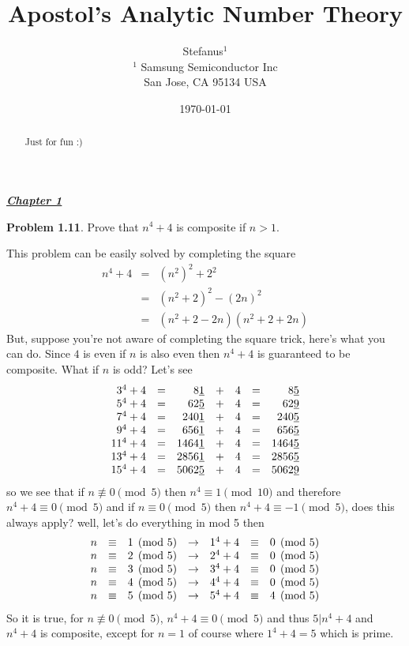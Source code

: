 \documentclass[aps,preprint,preprintnumbers,nofootinbib,showpacs,prd]{revtex4-1}
\newcommand{\nbea}{\begin{eqnarray*}}
\newcommand{\neea}{\end{eqnarray*}}
\begin{document}
\title{Apostol's Analytic Number Theory}
\bigskip
\author{Stefanus$^1$\\
$^1$ Samsung Semiconductor Inc\\ San Jose, CA 95134 USA\\
}
%
\date{\today}
%
\begin{abstract}
Just for fun :)

\end{abstract}
%
\maketitle

\renewcommand{\theequation}{A.\arabic{equation}}  %
\setcounter{equation}{0}  %

\bigskip
\underline{\textbf{\textit{Chapter 1}}}
\bigskip

{\bf Problem 1.11}. Prove that $n^4 + 4$ is composite if $n > 1$.

This problem can be easily solved by completing the square
%
\nbea
n^4 + 4 & = & (n^2)^2 + 2^2 \\
& = & (n^2 + 2)^2 - (2n)^2 \\
& = & (n^2 + 2 - 2n)(n^2 + 2 + 2n)
\neea
%
But, suppose you're not aware of completing the square trick, here's what you can do. Since $4$ is even if $n$ is also even then $n^4 + 4$ is guaranteed to be composite. What if $n$ is odd? Let's see
%
\nbea
\begin{array}{r c r c r c r}
3^4 + 4 & = & 8\underline{1} &+& 4 &=& 8\underline{5} \\
5^4 + 4 & = & 62\underline{5} &+& 4 &=& 62\underline{9} \\
7^4 + 4 & = & 240\underline{1} &+& 4 &=& 240\underline{5} \\
9^4 + 4 & = & 656\underline{1} &+& 4 &=& 656\underline{5} \\
11^4 + 4 & = & 1464\underline{1} &+& 4 &=& 1464\underline{5} \\
13^4 + 4 & = & 2856\underline{1} &+& 4 &=& 2856\underline{5} \\
15^4 + 4 & = & 5062\underline{5} &+& 4 &=& 5062\underline{9}
\end{array}
\neea
%
so we see that if $n \not\equiv 0 \pmod{5}$ then $n^4 \equiv 1 \pmod{10}$ and therefore $n^4 + 4 \equiv 0 \pmod{5}$ and if $n \equiv 0 \pmod{5}$ then $n^4 + 4 \equiv -1 \pmod{5}$, does this always apply? well, let's do everything in mod 5 then
%
\nbea
\begin{array}{r c l c r c l}
n & \equiv & 1\pmod{5} & \to & 1^4 + 4 & \equiv & 0 \pmod {5} \\
n & \equiv & 2\pmod{5} & \to & 2^4 + 4 & \equiv & 0 \pmod {5} \\
n & \equiv & 3\pmod{5} & \to & 3^4 + 4 & \equiv & 0 \pmod {5} \\
n & \equiv & 4\pmod{5} & \to & 4^4 + 4 & \equiv & 0 \pmod {5} \\
n & \equiv & 5\pmod{5} & \to & 5^4 + 4 & \equiv & 4 \pmod {5}
\end{array}
\neea
%
So it is true, for $n \not\equiv 0 \pmod{5}$, $n^4 + 4 \equiv 0 \pmod{5}$ and thus $5|n^4 + 4$ and $n^4 + 4$ is composite, except for $n=1$ of course where $1^4 + 4 = 5$ which is prime.
\end{document}
